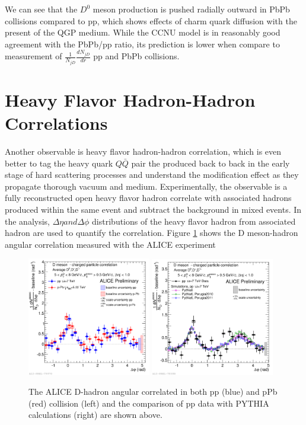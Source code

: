 We can see that the $D^0$ meson production is pushed radially outward in PbPb collisions compared to pp, which shows effects of charm quark diffusion with the present of the QGP medium. While the CCNU model is in reasonably good agreement with the PbPb/pp ratio, its prediction is lower when compare to measurement of $\frac{1}{N_{jD}}\frac{dN_{jD}}{dr}$ pp and PbPb collisions.


\section{Heavy Flavor Hadron-Hadron Correlations}

Another observable is heavy flavor hadron-hadron correlation, which is even better to tag the heavy quark $Q\bar Q$ pair the produced back to back in the early stage of hard scattering processes and understand the modification effect as they propagate thorough vacuum and medium. Experimentally, the observable is a fully reconstructed open heavy flavor hadron correlate with associated hadrons produced within the same event and subtract the background in mixed events. In the analysis, $\Delta \eta and \Delta \phi$ distributions of the heavy flavor hadron from associated hadron are used to quantify the correlation. Figure \ref{ALICEDHadron} shows the D meson-hadron angular correlation measured with the ALICE experiment \cite{DHadronRef}


\begin{figure}[hbtp]
\begin{center}
\includegraphics[width=0.48\textwidth]{Figures/Chapter2/ALICEDHadron.png}
\includegraphics[width=0.48\textwidth]{Figures/Chapter2/ALICEDHadronPP.png}
\caption{The ALICE D-hadron angular correlated in both pp (blue) and pPb (red) collision (left) and the comparison of pp data with PYTHIA calculations (right) are shown above.}
\label{ALICEDHadron}
\end{center}
\end{figure}   

